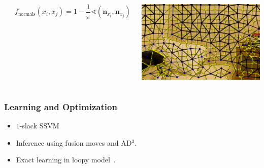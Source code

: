 \documentclass[final,ignorenonframetext,compress]{beamer}
\begin{document}
\begin{frame}
\begin{columns}[c]
\begin{center}
        \end{center}
        \[
            f_\text{normals}(x_i, x_j) = 1 - \frac{1}{\pi}\sphericalangle(\mathbf{n}_{x_i}, \mathbf{n}_{x_j})
         \]
        \begin{center}
            \includegraphics[width=.6\linewidth]{images/normal_feature_bright}
        \end{center}
    \end{columns}
\end{frame}

\begin{frame}
    \frametitle{Learning and Optimization}
    \begin{itemize}
        \item $1$-slack SSVM
        \item Inference using fusion moves and AD$^3$.
        \item Exact learning in loopy model~\parencite{mueller2014_exact}.
    \end{itemize}
\end{frame}
\end{document}
